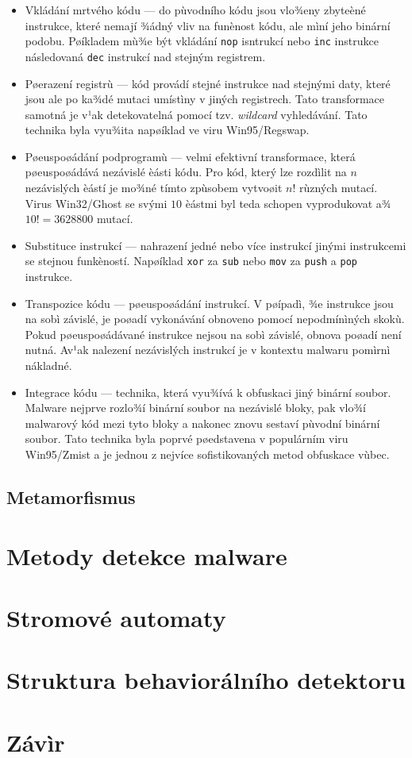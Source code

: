 \begin{itemize}
	\item Vkládání mrtvého kódu --- do pùvodního kódu jsou vlo¾eny zbyteèné instrukce, které nemají ¾ádný vliv na funènost kódu, ale mìní jeho binární podobu. Pøíkladem mù¾e být vkládání \texttt{nop} isntrukcí nebo \texttt{inc} instrukce následovaná \texttt{dec} instrukcí nad stejným registrem.

	\item Pøerazení registrù --- kód provádí stejné instrukce nad stejnými daty, které jsou ale po ka¾dé mutaci umístìny v jiných registrech. Tato transformace samotná je v¹ak detekovatelná pomocí tzv. \emph{wildcard} vyhledávání. Tato technika byla vyu¾ita napøíklad ve viru Win95/Regswap.

	\item Pøeuspoøádání podprogramù --- velmi efektivní transformace, která pøeuspoøádává nezávislé èásti kódu. Pro kód, který lze rozdìlit na $n$ nezávislých èástí je mo¾né tímto zpùsobem vytvoøit $n!$ rùzných mutací. Virus Win32/Ghost se svými $10$ èástmi byl teda schopen vyprodukovat a¾ $10! = 3628800$ mutací.

	\item Substituce instrukcí --- nahrazení jedné nebo více instrukcí jinými instrukcemi se stejnou funkèností. Napøíklad \texttt{xor} za \texttt{sub} nebo \texttt{mov} za \texttt{push} a \texttt{pop} instrukce.

	\item Transpozice kódu --- pøeuspoøádání instrukcí. V pøípadì, ¾e instrukce jsou na sobì závislé, je poøadí vykonávání obnoveno pomocí nepodmínìných skokù. Pokud pøeuspoøádávané instrukce nejsou na sobì závislé, obnova poøadí není nutná. Av¹ak nalezení nezávislých instrukcí je v kontextu malwaru pomìrnì nákladné.
	
	\item Integrace kódu --- technika, která vyu¾ívá k obfuskaci jiný binární soubor. Malware nejprve rozlo¾í  binární soubor na nezávislé bloky, pak vlo¾í malwarový kód mezi tyto bloky a nakonec znovu sestaví pùvodní binární soubor. Tato technika byla poprvé pøedstavena v populárním viru Win95/Zmist a je jednou z nejvíce sofistikovaných metod obfuskace vùbec.
\end{itemize}

\section{Metamorfismus}

\chapter{Metody detekce malware}
\chapter{Stromové automaty}
\chapter{Struktura behaviorálního detektoru}
\chapter{Závìr}

